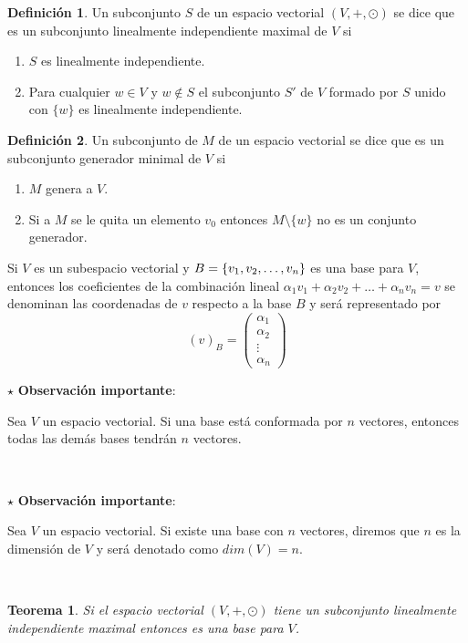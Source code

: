 \documentclass[10pt,a4paper]{report}
\newtheorem{theorem}{Teorema}[chapter]
\theoremstyle{definition}
\newtheorem{dfn}{Definición}[chapter]
\theoremstyle{remark}
\numberwithin{section}{chapter}
\numberwithin{equation}{chapter}
\numberwithin{tacounter}{chapter}
\newenvironment{obsimp}[0]
    {\noindent$\star$ \textbf{Observación importante}:
  \itshape
    }
    { 
    \\
    }
\begin{document}
\begin{dfn}
Un subconjunto $S$ de un espacio vectorial $(V, +, \odot)$ se dice que es un subconjunto linealmente independiente maximal de $V$ si\\
\begin{enumerate}
\item $S$ es linealmente independiente.
\item Para cualquier $w \in V$ y $w \notin S$ el subconjunto $S'$ de $V$ formado por $S$ unido con $\{w\}$ es linealmente independiente.
\end{enumerate}
\end{dfn}

\begin{dfn}
Un subconjunto de $M$ de un espacio vectorial se dice que es un subconjunto generador minimal de $V$ si
\begin{enumerate}
\item $M$ genera a $V$.
\item Si a $M$ se le quita un elemento $v_0$ entonces $M \setminus \{w\}$ no es un conjunto generador.
\end{enumerate}
\end{dfn}
Si $V$ es un subespacio vectorial y $B =  \lbrace v_1, v_2, \ldots, v_n \rbrace$ es una base para $V$, entonces los coeficientes de la combinación lineal $\alpha_1 v_1 + \alpha_2 v_2 + \ldots + \alpha_n v_n = v$ se denominan las coordenadas de $v$ respecto a la base $B$ y será representado por 
$$(v)_B = \left( \begin{array}{c}
\alpha_1\\
\alpha_2\\
\vdots\\
\alpha_n  \end{array} \right)$$

\begin{obsimp}
Sea $V$ un espacio vectorial. Si una base está conformada por $n$ vectores, entonces todas las demás bases tendrán $n$ vectores.
\end{obsimp}

\begin{obsimp}
Sea $V$ un espacio vectorial. Si existe una base con $n$ vectores, diremos que $n$ es la dimensión de $V$ y será denotado como $dim (V) = n$.
\end{obsimp}

\begin{theorem}
Si el espacio vectorial $(V , + , \odot)$ tiene un subconjunto linealmente independiente maximal  entonces es una base para $V$.

\end{theorem}
\end{document}

